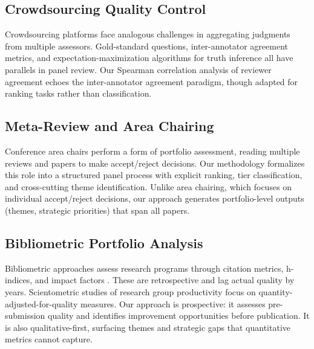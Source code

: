 \subsection{Crowdsourcing Quality Control}

Crowdsourcing platforms face analogous challenges in aggregating judgments from multiple assessors. Gold-standard questions, inter-annotator agreement metrics, and expectation-maximization algorithms for truth inference \cite{snow2008cheap,raykar2010learning} all have parallels in panel review. Our Spearman correlation analysis of reviewer agreement echoes the inter-annotator agreement paradigm, though adapted for ranking tasks rather than classification.

\subsection{Meta-Review and Area Chairing}

Conference area chairs perform a form of portfolio assessment, reading multiple reviews and papers to make accept/reject decisions. Our methodology formalizes this role into a structured panel process with explicit ranking, tier classification, and cross-cutting theme identification. Unlike area chairing, which focuses on individual accept/reject decisions, our approach generates portfolio-level outputs (themes, strategic priorities) that span all papers.

\subsection{Bibliometric Portfolio Analysis}

Bibliometric approaches assess research programs through citation metrics, h-indices, and impact factors \cite{hirsch2005index}. These are retrospective and lag actual quality by years. Scientometric studies of research group productivity \cite{abramo2009research} focus on quantity-adjusted-for-quality measures. Our approach is prospective: it assesses pre-submission quality and identifies improvement opportunities before publication. It is also qualitative-first, surfacing themes and strategic gaps that quantitative metrics cannot capture.
